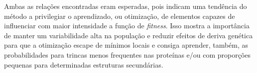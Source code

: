 Ambas as relações encontradas eram esperadas, pois indicam uma tendência do método a privilegiar o aprendizado, ou otimização, de elementos capazes de influenciar com maior intensidade a função de \textit{fitness}. Isso mostra a importância de manter um variabilidade alta na população e reduzir efeitos de deriva genética para que a otimização escape de mínimos locais e consiga aprender, também, as probabilidades para trincas menos frequentes nas proteínas e/ou com proporções pequenas para determinadas estruturas secundárias.





